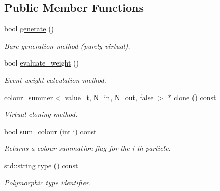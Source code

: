 \subsection*{Public Member Functions}
\begin{DoxyCompactItemize}
\item 
bool \hyperlink{a00088_aa137ad3cabaa0481dc78da1a2a3718d7}{generate} ()
\begin{DoxyCompactList}\small\item\em \textquotesingle{}Bare generation\textquotesingle{} method (purely virtual). \end{DoxyCompactList}\item 
\hypertarget{a00088_ac8b8b8c273a01b44102017aa78ce5926}{}bool \hyperlink{a00088_ac8b8b8c273a01b44102017aa78ce5926}{evaluate\+\_\+weight} ()\label{a00088_ac8b8b8c273a01b44102017aa78ce5926}

\begin{DoxyCompactList}\small\item\em Event weight calculation method. \end{DoxyCompactList}\item 
\hypertarget{a00088_afb07031bf02960e818bacba52f4b5d02}{}\hyperlink{a00087}{colour\+\_\+summer}$<$ value\+\_\+t, N\+\_\+in, N\+\_\+out, false $>$ $\ast$ \hyperlink{a00088_afb07031bf02960e818bacba52f4b5d02}{clone} () const \label{a00088_afb07031bf02960e818bacba52f4b5d02}

\begin{DoxyCompactList}\small\item\em Virtual cloning method. \end{DoxyCompactList}\item 
bool \hyperlink{a00088_a1ab8045a6f4f9254f00de85c7d6e6e46}{sum\+\_\+colour} (int i) const 
\begin{DoxyCompactList}\small\item\em Returns a colour summation flag for the i-\/th particle. \end{DoxyCompactList}\item 
\hypertarget{a00088_ac9c77834f2f1ff0e19cf8b340ad2ceaf}{}std\+::string \hyperlink{a00088_ac9c77834f2f1ff0e19cf8b340ad2ceaf}{type} () const \label{a00088_ac9c77834f2f1ff0e19cf8b340ad2ceaf}

\begin{DoxyCompactList}\small\item\em Polymorphic type identifier. \end{DoxyCompactList}\end{DoxyCompactItemize}
